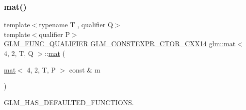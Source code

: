\mbox{\label{structglm_1_1mat_3_014_00_012_00_01_t_00_01_q_01_4_a780dbdda12c004d1894b31daede7e9ce}} 
\subsubsection{\texorpdfstring{mat()}{mat()}\hspace{0.1cm}{\footnotesize\ttfamily [18/21]}}
{\footnotesize\ttfamily template$<$typename T , qualifier Q$>$ \\
template$<$qualifier P$>$ \\
\hyperlink{setup_8hpp_a33fdea6f91c5f834105f7415e2a64407}{G\+L\+M\+\_\+\+F\+U\+N\+C\+\_\+\+Q\+U\+A\+L\+I\+F\+I\+ER} \hyperlink{setup_8hpp_a0900f9145e68bf6061b6f5e7be3fa751}{G\+L\+M\+\_\+\+C\+O\+N\+S\+T\+E\+X\+P\+R\+\_\+\+C\+T\+O\+R\+\_\+\+C\+X\+X14} \hyperlink{structglm_1_1mat}{glm\+::mat}$<$ 4, 2, T, Q $>$\+::\hyperlink{structglm_1_1mat}{mat} (\begin{DoxyParamCaption}\item[{\hyperlink{structglm_1_1mat}{mat}$<$ 4, 2, T, P $>$ const \&}]{m }\end{DoxyParamCaption})}



G\+L\+M\+\_\+\+H\+A\+S\+\_\+\+D\+E\+F\+A\+U\+L\+T\+E\+D\+\_\+\+F\+U\+N\+C\+T\+I\+O\+NS. 

\mbox{\label{structglm_1_1mat_3_014_00_012_00_01_t_00_01_q_01_4_abafe54829e43297a21e26ae004aa8db0}} 
